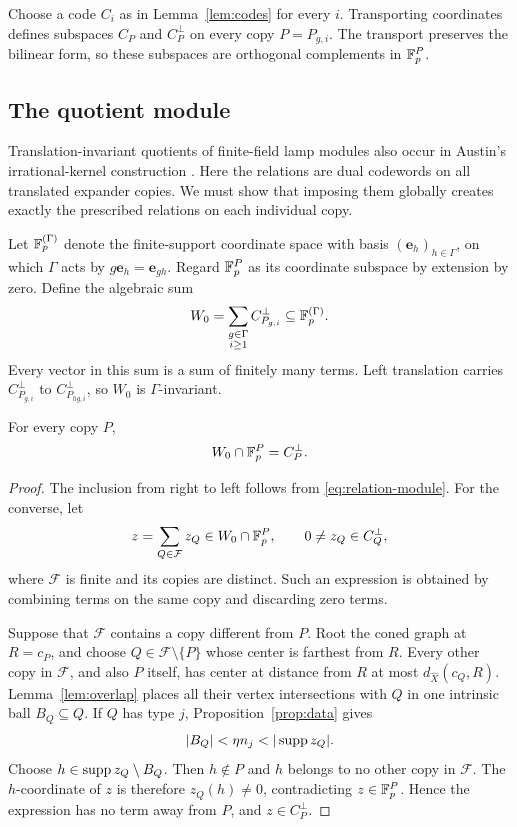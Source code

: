 Choose a code \(C_i\) as in Lemma~\ref{lem:codes} for every \(i\).
Transporting coordinates defines subspaces \(C_P\) and \(C_P^\perp\)
on every copy \(P=P_{g,i}\).  The transport preserves the bilinear
form, so these subspaces are orthogonal complements in \(\mathbb F_p^P\).

\subsection{The quotient module}

Translation-invariant quotients of finite-field lamp modules also occur
in Austin's irrational-kernel construction
\cite[Sections~1--2]{Austin2013}. Here the relations are dual codewords on
all translated expander copies. We must show that imposing them globally
creates exactly the prescribed relations on each individual copy.

Let \(\mathbb F_p^{(\Gamma)}\) denote the finite-support coordinate space with
basis \((\mathbf e_h)_{h\in\Gamma}\), on which \(\Gamma\) acts by
\(g\mathbf e_h=\mathbf e_{gh}\).  Regard \(\mathbb F_p^P\) as its coordinate
subspace by extension by zero.  Define the algebraic sum
\begin{equation}
\label{eq:relation-module}
  W_0=\sum_{\substack{g\in\Gamma\\i\ge1}} C_{P_{g,i}}^\perp
  \subseteq\mathbb F_p^{(\Gamma)}.
\end{equation}
Every vector in this sum is a sum of finitely many terms.  Left
translation carries \(C_{P_{g,i}}^\perp\) to
\(C_{P_{hg,i}}^\perp\), so \(W_0\) is \(\Gamma\)-invariant.

\begin{lemma}
\label{lem:module-intersection}
For every copy \(P\),
\begin{equation}
\label{eq:module-intersection}
  W_0\cap\mathbb F_p^P=C_P^\perp.
\end{equation}
\end{lemma}

\begin{proof}
The inclusion from right to left follows from
\eqref{eq:relation-module}.  For the converse, let
\[
  z=\sum_{Q\in\mathcal F}z_Q\in W_0\cap\mathbb F_p^P,
  \qquad 0\ne z_Q\in C_Q^\perp,
\]
where \(\mathcal F\) is finite and its copies are distinct.  Such an
expression is obtained by combining terms on the same copy and
discarding zero terms.

Suppose that \(\mathcal F\) contains a copy different from \(P\).
Root the coned graph at \(R=c_P\), and choose
\(Q\in\mathcal F\setminus\{P\}\) whose center is farthest from \(R\).
Every other copy in \(\mathcal F\), and also \(P\) itself, has center at
distance from \(R\) at most \(d_{\widehat X}(c_Q,R)\).
Lemma~\ref{lem:overlap} places all their vertex intersections with \(Q\)
in one intrinsic ball \(B_Q\subseteq Q\).
If \(Q\) has type \(j\), Proposition~\ref{prop:data} gives
\[
  |B_Q|<\eta n_j<|\supp z_Q|.
\]
Choose \(h\in\operatorname{supp} z_Q\setminus B_Q\).  Then \(h\notin P\) and
\(h\) belongs to no other copy in \(\mathcal F\).  The \(h\)-coordinate
of \(z\) is therefore \(z_Q(h)\ne0\), contradicting
\(z\in\mathbb F_p^P\).
Hence the expression has no term away from \(P\), and
\(z\in C_P^\perp\).
\end{proof}

